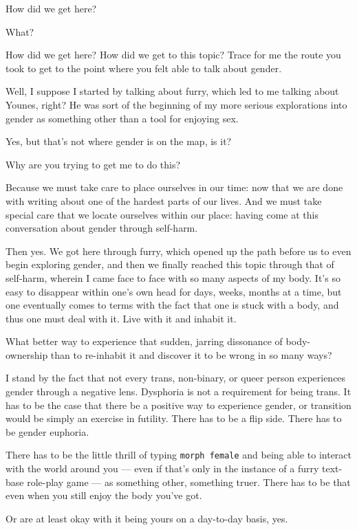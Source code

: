 \label{gender:gender}
\begin{paracol}{2}
\begin{leftcolumn}
\begin{ally}
How did we get here?
\end{ally}
What?

\begin{ally}
How did we get here? How did we get to this topic? Trace for me the route you took to get to the point where you felt able to talk about gender.
\end{ally}
Well, I suppose I started by talking about furry, which led to me talking about Younes, right? He was sort of the beginning of my more serious explorations into gender as something other than a tool for enjoying sex.

\begin{ally}
Yes, but that's not where gender is on the map, is it?
\end{ally}
Why are you trying to get me to do this?

\begin{ally}
Because we must take care to place ourselves in our time: now that we are done with writing about one of the hardest parts of our lives. And we must take special care that we locate ourselves within our place: having come at this conversation about gender through self-harm.
\end{ally}
Then yes. We got here through furry, which opened up the path before us to even begin exploring gender, and then we finally reached this topic through that of self-harm, wherein I came face to face with so many aspects of my body. It's so easy to disappear within one's own head for days, weeks, months at a time, but one eventually comes to terms with the fact that one is stuck with a body, and thus one must deal with it. Live with it and inhabit it.

What better way to experience that sudden, jarring dissonance of body-ownership than to re-inhabit it and discover it to be wrong in so many ways?
\newpage

\noindent I stand by the fact that not every trans, non-binary, or queer person experiences gender through a negative lens. Dysphoria is not a requirement for being trans. It has to be the case that there be a positive way to experience gender, or transition would be simply an exercise in futility. There has to be a flip side. There has to be gender euphoria.

\begin{ally}
There has to be the little thrill of typing \texttt{morph\ female} and being able to interact with the world around you --- even if that's only in the instance of a furry text-base role-play game --- as something other, something truer. There has to be that even when you still enjoy the body you've got.
\end{ally}
Or are at least okay with it being yours on a day-to-day basis, yes.


\end{leftcolumn}
\end{paracol}
